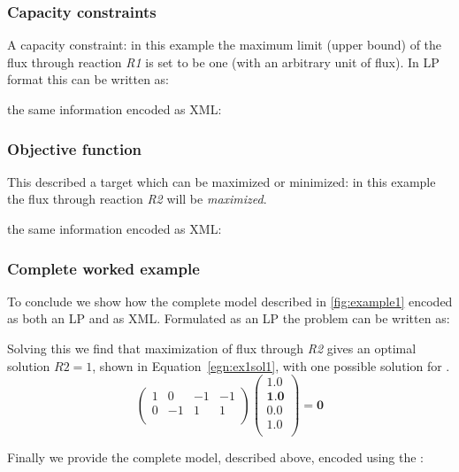 \subsubsection{Capacity constraints}
\label{examples1:fluxbound}
A capacity constraint: in this example the maximum limit (upper bound) 
of the flux through reaction \textit{R1} is set to be one (with an 
arbitrary unit of flux). In LP format this can be written as: 

%
%
the same information encoded as XML:
%

\subsubsection{Objective function}
\label{examples1:objfunc}
This described a target which can be maximized or minimized: in this 
example the flux through reaction \textit{R2} will be 
\textit{maximized}. 

%
%
the same information encoded as XML:
%

\subsubsection{Complete worked example}
\label{examples1:complete}
To conclude we show how the complete model described in 
\ref{fig:example1} encoded as both an LP and as XML. Formulated as an LP 
the problem can be written as: 

%
%
Solving this we find that maximization of flux through \textit{R2}
gives an optimal solution $R2 = 1$, shown in Equation~\ref{egn:ex1sol1}, with one possible solution
for \Jvec.
\begin{equation}\label{egn:ex1sol1}
  \left(
    \begin{array}{cccc}
        1 &  0 & -1 & -1 \\
        0 & -1 &  1 &  1 \\
    \end{array}
  \right)
  \left(
    \begin{array}{c}
        1.0 \\
        \textbf{1.0} \\
        0.0 \\
        1.0 \\
    \end{array}
  \right)
  = \textbf{0}
\end{equation}

Finally we provide the complete model, described above, encoded using the \FBCPackage:
%
